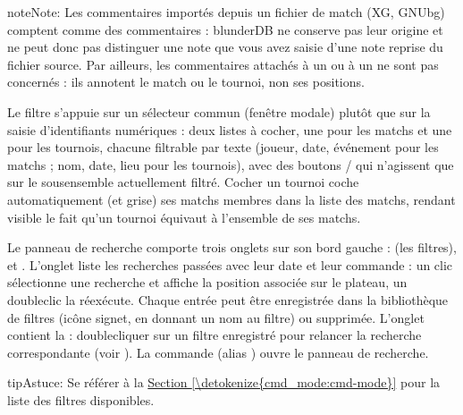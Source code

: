 \documentclass[letterpaper,10pt,french]{sphinxmanual}
\begin{document}
\begin{sphinxadmonition}{note}{Note:}
\sphinxAtStartPar
Les commentaires importés depuis un fichier de match (XG, GNUbg)
comptent comme des commentaires : blunderDB ne conserve pas leur origine et ne
peut donc pas distinguer une note que vous avez saisie d’une note reprise du
fichier source. Par ailleurs, les commentaires attachés à un  ou à un
 ne sont pas concernés : ils annotent le match ou le tournoi, non ses
positions.
\end{sphinxadmonition}

\sphinxAtStartPar
Le filtre  s’appuie sur un sélecteur commun (fenêtre modale)
plutôt que sur la saisie d’identifiants numériques : deux listes à cocher, une
pour les matchs et une pour les tournois, chacune filtrable par texte (joueur,
date, événement pour les matchs ; nom, date, lieu pour les tournois), avec des
boutons  /  qui n’agissent que sur le sous\sphinxhyphen{}ensemble actuellement
filtré. Cocher un tournoi coche automatiquement (et grise) ses matchs membres
dans la liste des matchs, rendant visible le fait qu’un tournoi équivaut à
l’ensemble de ses matchs.

\sphinxAtStartPar
Le panneau de recherche comporte trois onglets sur son bord gauche :
 (les filtres),  et . L’onglet
 liste les recherches passées avec leur date et leur commande :
un clic sélectionne une recherche et affiche la position associée sur le
plateau, un double\sphinxhyphen{}clic la ré\sphinxhyphen{}exécute. Chaque entrée peut être enregistrée
dans la bibliothèque de filtres (icône signet, en donnant un nom au filtre) ou
supprimée. L’onglet  contient la  :
double\sphinxhyphen{}cliquer sur un filtre enregistré pour relancer la recherche
correspondante (voir {\hyperref[\detokenize{annexe_filtres:annexe-filtres}]{}}). La commande  (alias
) ouvre le panneau de recherche.

\begin{sphinxadmonition}{tip}{Astuce:}
\sphinxAtStartPar
Se référer à la \hyperref[\detokenize{cmd_mode:cmd-mode}]{Section \ref{\detokenize{cmd_mode:cmd-mode}}} pour la liste des filtres
disponibles.
\end{sphinxadmonition}
\end{document}
